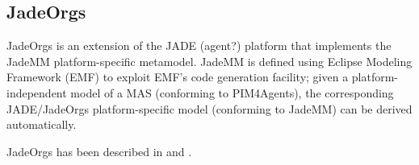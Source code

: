 \subsection{JadeOrgs}

JadeOrgs is an extension of the JADE (agent?) platform that implements the JadeMM platform-specific metamodel.
JadeMM is defined using Eclipse Modeling Framework (EMF) to exploit EMF's code generation facility; given a platform-independent model of a MAS (conforming to PIM4Agents), the corresponding JADE/JadeOrgs platform-specific model (conforming to JadeMM) can be derived automatically.

JadeOrgs has been described in \cite{Madrigal-Mora08} and \cite{Madrigal-Mora09}.